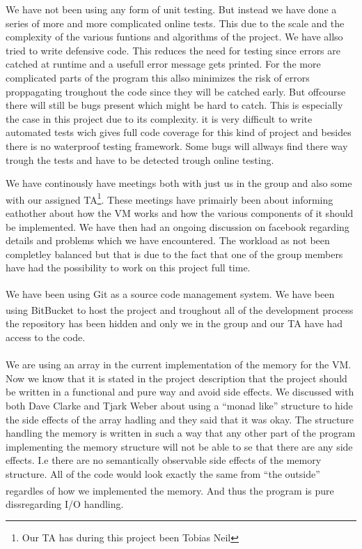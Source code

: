 \documentclass{article}
\begin{document}
We have not been using any form of unit testing. But instead we have done a
series of more and more complicated online tests. This due to the scale and the
complexity of the various funtions and algorithms of the project. We have allso
tried to write defensive code. This reduces the need for testing since errors
are catched at runtime and a usefull error message gets printed. For the more
complicated parts of the program this allso minimizes the risk of errors
proppagating troughout the code since they will be catched early. But offcourse
there will still be bugs present which might be hard to catch. This is
especially the case in this project due to its complexity. it is very difficult
to write automated tests wich gives full code coverage for this kind of project
and besides there is no waterproof testing framework. Some bugs will allways
find there way trough the tests and have to be detected trough online testing.

We have continously have meetings both with just us in the group and also some
with our assigned TA\footnote{Our TA has during this project been Tobias Neil}.
These meetings have primairly been about informing eathother about how the 
VM works and how the various components of it should be
implemented. We have then had an ongoing discussion on facebook regarding
details and problems which we have encountered. The workload as not been
completley balanced but that is due to the fact that one of the group members
have had the possibility to work on this project full time.

We have been using Git\textsuperscript{\cite{git}} as a source code management
system. We have been using BitBucket\textsuperscript{\cite{bitbucket}} to
host the project and troughout all of the development process the repository has 
been hidden and only we in the group and our TA have had access to the code.\\
\\
We are using an array in the current implementation of the memory for the VM.
Now we know that it is stated in the project description that the project should
be written in a functional and pure way and avoid side effects. We discussed
with both Dave Clarke and Tjark Weber about using a ``monad like'' structure 
to hide the side effects of the array hadling and they said that it was okay.
The structure handling the memory is written in such a way that any other part
of the program implementing the memory structure will not be able to se that there
are any side effects. I.e there are no semantically observable side effects of 
the memory structure. All of the code would look exactly the same from ``the
outside'' regardles of how we implemented the memory. And thus the program is
pure\textsuperscript{\cite{pure}} dissregarding I/O handling.
\end{document}
